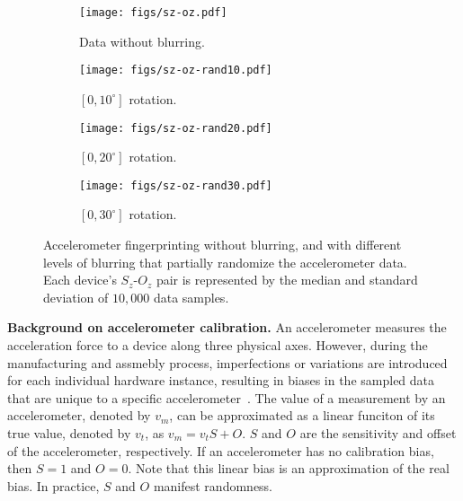 \begin{figure*}
\centering
\begin{subfigure}[b]{.25\textwidth}
  \centering
  \texttt{[image: figs/sz-oz.pdf]}
  \caption{Data without blurring.}
  \label{fig:sub1}
\end{subfigure}%
\begin{subfigure}[b]{.25\textwidth}
  \centering
  \texttt{[image: figs/sz-oz-rand10.pdf]}
  \caption{$[0, 10^{\circ}]$ rotation.}
  \label{fig:sub2}
\end{subfigure}%
\begin{subfigure}[b]{.25\textwidth}
  \centering
  \texttt{[image: figs/sz-oz-rand20.pdf]}
  \caption{$[0, 20^{\circ}]$ rotation.}
  \label{fig:sub3}
\end{subfigure}%
\begin{subfigure}[b]{.25\textwidth}
  \centering
  \texttt{[image: figs/sz-oz-rand30.pdf]}
  \caption{$[0, 30^{\circ}]$ rotation.}
  \label{fig:sub3}
\end{subfigure}%

\caption{\small Accelerometer fingerprinting without blurring, and with different levels of 
blurring that partially randomize the accelerometer data. Each device's $S_z$-$O_z$
pair is represented by the median and standard deviation of $10,000$ data samples.
}

\label{fig:fingerprinting}
\end{figure*}

\textbf{Background on accelerometer calibration.}
An accelerometer measures the acceleration force to a device along three 
physical axes. However, during the manufacturing and assmebly process, 
imperfections or variations are introduced for each individual hardware 
instance, resulting in biases in the sampled data that are unique to a specific
accelerometer~\cite{doscher1998accelerometer}. The value of a measurement
by an accelerometer, denoted by $v_m$, can be approximated as a linear 
funciton of its true value, denoted by $v_t$, as $v_m=v_tS+O$. $S$ and $O$
are the sensitivity and offset of the accelerometer, respectively. If an 
accelerometer has no calibration bias, then $S=1$ and $O=0$. Note that
this linear bias is an approximation of the real bias. In practice, $S$ and $O$
manifest randomness.


